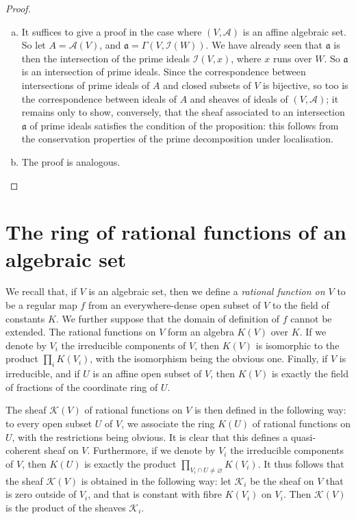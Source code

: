 \documentclass{article}
\theoremstyle{plain}
\newcommand{\sh}{\mathscr}
\newcommand{\oldpage}[1]{\marginpar{\footnotesize$\Big\vert$ \textit{p.~#1}}}
\begin{document}
\begin{proof}
  \begin{enumerate}[(a)]
    \item It suffices to give a proof in the case where $(V,\sh{A})$ is an affine algebraic set.
      So let $A=\sh{A}(V)$, and $\mathfrak{a}=\Gamma(V,\sh{I}(W))$.
      We have already seen that $\mathfrak{a}$ is then the intersection of the prime ideals $\sh{I}(V,x)$, where $x$ runs over $W$.
      So $\mathfrak{a}$ is an intersection of prime ideals.
      Since the correspondence between intersections of prime ideals of $A$ and closed subsets of $V$ is bijective, so too is the correspondence between ideals of $A$ and sheaves of ideals of $(V,\sh{A})$;
      it remains only to show, conversely, that the sheaf associated to an intersection $\mathfrak{a}$ of prime ideals satisfies the condition of the proposition: this follows from the conservation properties of the prime decomposition under localisation.
    \item The proof is analogous.
  \end{enumerate}
\end{proof}


\section{The ring of rational functions of an algebraic set}
\label{section3}

We recall that, if $V$ is an algebraic set, then we define a \emph{rational function on $V$} to be a regular map $f$ from an everywhere-dense open subset of $V$ to the field of constants $K$.
We further suppose that the domain of definition of $f$ cannot be extended.
The rational functions on $V$ form an algebra $K(V)$ over $K$.
If we denote by $V_i$ the irreducible components of $V$, then $K(V)$ is isomorphic to the product $\prod_i K(V_i)$, with the isomorphism being the obvious one.
Finally, if $V$ is irreducible, and if $U$ is an affine open subset of $V$, then $K(V)$ is exactly the field of fractions of the coordinate ring of $U$.

The sheaf $\sh{K}(V)$ of rational functions on $V$ is then defined in the following way:
to every open subset $U$ of $V$, we associate the ring $K(U)$ of
\oldpage{2-04}
rational functions on $U$, with the restrictions being obvious.
It is clear that this defines a quasi-coherent sheaf on $V$.
Furthermore, if we denote by $V_i$ the irreducible components of $V$, then $K(U)$ is exactly the product $\prod_{V_i\cap U\neq\varnothing}K(V_i)$.
It thus follows that the sheaf $\sh{K}(V)$ is obtained in the following way:
let $\sh{K}_i$ be the sheaf on $V$ that is zero outside of $V_i$, and that is constant with fibre $K(V_i)$ on $V_i$.
Then $\sh{K}(V)$ is the product of the sheaves $\sh{K}_i$.
\end{document}
